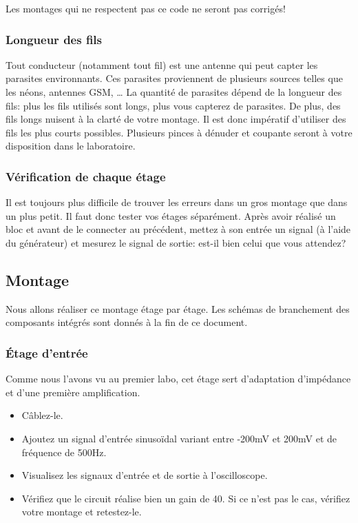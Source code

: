 Les montages qui ne respectent pas ce code ne seront pas corrigés!

\subsubsection{Longueur des fils}
Tout conducteur (notamment tout fil) est une antenne qui peut capter les parasites environnants. Ces parasites proviennent de plusieurs sources telles que les néons, antennes GSM, … La quantité de parasites dépend de la longueur des fils: plus les fils utilisés sont longs, plus vous capterez de parasites. De plus, des fils longs nuisent à la clarté de votre montage.
Il est donc impératif d’utiliser des fils les plus courts possibles. Plusieurs pinces à dénuder et coupante seront à votre disposition dans le laboratoire.

\subsubsection{Vérification de chaque étage}
Il est toujours plus difficile de trouver les erreurs dans un gros montage que dans un plus petit. Il faut donc tester vos étages séparément. Après avoir réalisé un bloc et avant de le connecter au précédent, mettez à son entrée un signal (à l’aide du générateur) et mesurez le signal de sortie: est-il bien celui que vous attendez?

\subsection{Montage}
Nous allons réaliser ce montage étage par étage. Les schémas de branchement des composants intégrés sont donnés à la fin de ce document.
\subsubsection{Étage d’entrée}
Comme nous l’avons vu au premier labo, cet étage sert d’adaptation d’impédance et d’une première amplification.

\begin{itemize}
\item Câblez-le.
\item Ajoutez un signal d’entrée sinusoïdal variant entre -200mV et 200mV et de fréquence de 500Hz.
\item Visualisez les signaux d’entrée et de sortie à l’oscilloscope.
\item Vérifiez que le circuit réalise bien un gain de 40. Si ce n’est pas le cas, vérifiez votre montage et retestez-le.
\end{itemize}


